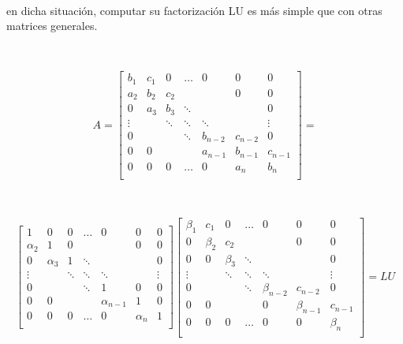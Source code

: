 \

en dicha situación, computar su factorización LU es más simple que con otras matrices generales.

\

\[
A =
\begin{bmatrix}
    b_{1} & c_{1} & 0      & \ldots & 0 & 0 & 0 \\
    a_{2} & b_{2} & c_{2} &   &   & 0 & 0 \\
    0      & a_{3} & b_{3} & \ddots  &   &  & 0 \\
    \vdots &        & \ddots & \ddots & \ddots &  & \vdots \\
    0      &        &        & \ddots & b_{n-2} & c_{n-2} & 0 \\
    0      & 0      &        &  & a_{n-1} & b_{n-1} & c_{n-1} \\
    0      & 0      & 0 & \ldots & 0 & a_{n} & b_{n} \\
\end{bmatrix}
=
\]

\

\[
\begin{bmatrix}
    1 & 0 & 0      & \ldots & 0 & 0 & 0 \\
    \alpha_{2} & 1 & 0 &   &   & 0 & 0 \\
    0      & \alpha_{3} & 1 & \ddots  &   &  & 0 \\
    \vdots &        & \ddots & \ddots & \ddots &  & \vdots \\
    0      &        &        & \ddots & 1 & 0 & 0 \\
    0      & 0      &        &  & \alpha_{n-1} & 1 & 0 \\
    0      & 0      & 0 & \ldots & 0 & \alpha_{n} & 1 \\
\end{bmatrix}
\begin{bmatrix}
    \beta_{1} & c_{1} & 0      & \ldots & 0 & 0 & 0 \\
    0 & \beta_{2} & c_{2} &   &   & 0 & 0 \\
    0      & 0 & \beta_{3} & \ddots  &   &  & 0 \\
    \vdots &        & \ddots & \ddots & \ddots &  & \vdots \\
    0      &        &        & \ddots & \beta_{n-2} & c_{n-2} & 0 \\
    0      & 0      &        &  & 0 & \beta_{n-1} & c_{n-1} \\
    0      & 0      & 0 & \ldots & 0 & 0 & \beta_{n} \\
\end{bmatrix}
= LU
\]

